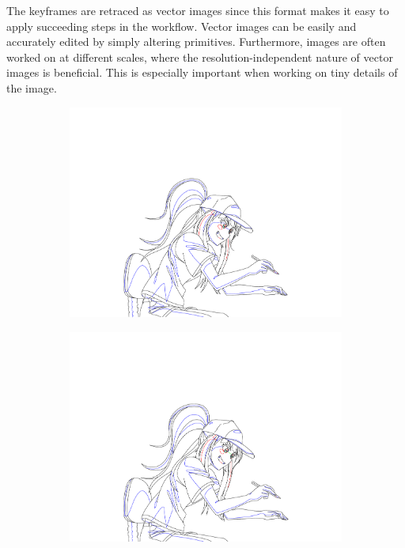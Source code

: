 The keyframes are retraced as vector images since this format makes it easy to apply succeeding steps in the workflow. Vector images can be easily and accurately edited by simply altering primitives. Furthermore, images are often worked on at different scales, where the resolution-independent nature of vector images is beneficial. This is especially important when working on tiny details of the image.

\begin{figure}[h]
    \begin{subfigure}[b]{0.3\textwidth}
    \includegraphics[width=\textwidth]{graphics/douga/007AD_DOU_26.pdf}
    \end{subfigure}
    \begin{subfigure}[b]{0.3\textwidth}
    \includegraphics[width=\textwidth]{graphics/douga/007AD_DOU_27.pdf}

\end{subfigure}
\end{figure}
